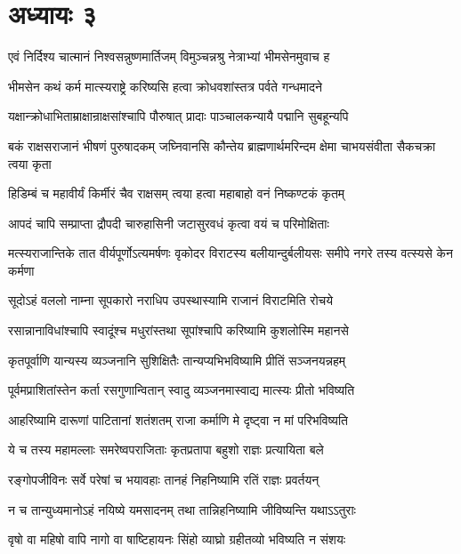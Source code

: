 \chapter{अध्यायः ३}

\twolineshloka
{एवं निर्दिश्य चात्मानं निश्वसन्नुष्णमार्तिजम्}
{विमुञ्चन्नश्रु नेत्राभ्यां भीमसेनमुवाच ह}


\twolineshloka
{भीमसेन कथं कर्म मात्स्यराष्ट्रे करिष्यसि}
{हत्वा क्रोधवशांस्तत्र पर्वते गन्धमादने}


\twolineshloka
{यक्षान्क्रोधाभिताम्राक्षान्राक्षसांश्चापि पौरुषात्}
{प्रादाः पाञ्चालकन्यायै पद्मानि सुबहून्यपि}


\threelineshloka
{बकं राक्षसराजानं भीषणं पुरुषादकम्}
{जघ्निवानसि कौन्तेय ब्राह्मणार्थमरिन्दम}
{क्षेमा चाभयसंवीता सैकचक्रा त्वया कृता}


\twolineshloka
{हिडिम्बं च महावीर्यं किर्मीरं चैव राक्षसम्}
{त्वया हत्वा महाबाहो वनं निष्कण्टकं कृतम्}


\twolineshloka
{आपदं चापि सम्प्राप्ता द्रौपदी चारुहासिनी}
{जटासुरवधं कृत्वा वयं च परिमोक्षिताः}


\threelineshloka
{मत्स्यराजान्तिके तात वीर्यपूर्णोऽत्यमर्षणः}
{वृकोदर विराटस्य बलीयान्दुर्बलीयसः}
{समीपे नगरे तस्य वत्स्यसे केन कर्मणा}




\twolineshloka
{सूदोऽहं वललो नाम्ना सूपकारो नराधिप}
{उपस्थास्यामि राजानं विराटमिति रोचये}


\twolineshloka
{रसान्नानाविधांश्चापि स्वादूंश्च मधुरांस्तथा}
{सूपांश्चापि करिष्यामि कुशलोस्मि महानसे}


\twolineshloka
{कृतपूर्वाणि यान्यस्य व्यञ्जनानि सुशिक्षितैः}
{तान्यप्यभिभविष्यामि प्रीतिं सञ्जनयन्नहम्}


\twolineshloka
{पूर्वमप्राशितांस्तेन कर्ता रसगुणान्वितान्}
{स्वादु व्यञ्जनमास्वाद्य मात्स्यः प्रीतो भविष्यति}


\twolineshloka
{आहरिष्यामि दारूणां पाटितानां शतंशतम्}
{राजा कर्माणि मे दृष्ट्वा न मां परिभविष्यति}


\twolineshloka
{ये च तस्य महामल्लाः समरेष्वपराजिताः}
{कृतप्रतापा बहुशो राज्ञः प्रत्यायिता बले}


\twolineshloka
{रङ्गोपजीविनः सर्वे परेषां च भयावहाः}
{तानहं निहनिष्यामि रतिं राज्ञः प्रवर्तयन्}


\twolineshloka
{न च तान्युध्यमानोऽहं नयिष्ये यमसादनम्}
{तथा तान्निहनिष्यामि जीविष्यन्ति यथाऽऽतुराः}


\twolineshloka
{वृषो वा महिषो वापि नागो वा षाष्टिहायनः}
{सिंहो व्याघ्रो ग्रहीतव्यो भविष्यति न संशयः}


